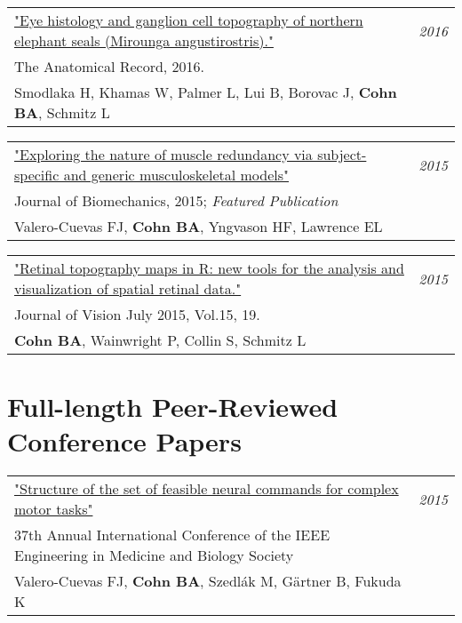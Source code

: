 \documentclass[10pt,a4paper]{article}
\begin{document}
\vspace*{1mm}\noindent\begin{tabularx}{17cm}{X r}
    \href{smodlaka_et_al_2016_the_anatomical_record.pdf}{"Eye histology and ganglion cell topography of northern elephant seals (Mirounga angustirostris)."}  & \textit{2016}\\
    The Anatomical Record, 2016. \\
    Smodlaka H, Khamas W, Palmer L, Lui B, Borovac J, \textbf{Cohn BA}, Schmitz L \\[2mm]
\end{tabularx}

\vspace*{1mm}\noindent\begin{tabularx}{17cm}{X r}
    \href{https://github.com/bc/resume/raw/master/papers/valero_cuevas_2015_job.pdf}{"Exploring the nature of muscle redundancy via subject-specific and generic musculoskeletal models" } & \textit{2015}\\
    Journal of Biomechanics, 2015; \textit{Featured Publication} \\
    Valero-Cuevas FJ, \textbf{Cohn BA}, Yngvason HF, Lawrence EL \\[2mm]
\end{tabularx}


\vspace*{1mm}\noindent\begin{tabularx}{17cm}{X r}
    \href{https://github.com/bc/resume/raw/master/papers/cohn_et_al_2015_jov.pdf}{"Retinal topography maps in R: new tools for the analysis and visualization of spatial retinal data."}  & \textit{2015}\\
    Journal of Vision July 2015, Vol.15, 19. \\
    \textbf{Cohn BA}, Wainwright P, Collin S, Schmitz L \\[2mm]
\end{tabularx}


\vspace*{3mm}\section*{Full-length Peer-Reviewed Conference Papers} 

\vspace*{1mm}\noindent\begin{tabularx}{17cm}{X r}
    \href{https://github.com/bc/resume/raw/master/papers/valero_cuevas_et_al_2015_ieee_embs.pdf}{"Structure of the set of feasible neural commands for complex motor tasks" } & \textit{2015}\\
    37th Annual International Conference of the IEEE Engineering in Medicine and Biology Society \\
    Valero-Cuevas FJ, \textbf{Cohn BA}, Szedl\'{a}k M, G{\"a}rtner B, Fukuda K \\[2mm]
\end{tabularx}
\end{document}
